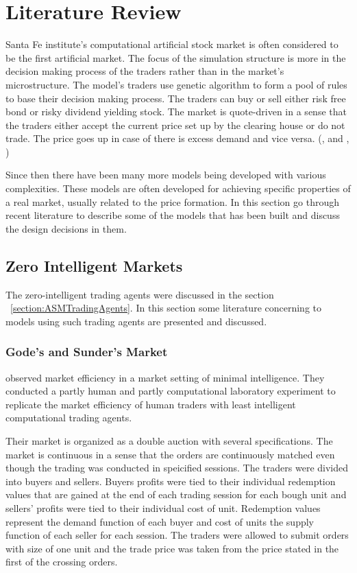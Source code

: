 \section{Literature Review}

Santa Fe institute's computational artificial stock 
market is often considered to be the first artificial market. 
The focus of the simulation structure is more in the 
decision making process of the traders rather than in the 
market's microstructure. The model's traders use 
genetic algorithm to form a pool of rules to base
their decision making process. The traders can buy or
sell either risk free bond or risky dividend yielding stock.
The market is quote-driven in a sense that the traders
either accept the current price set up by the clearing house
or do not trade. The price goes up in case of there is excess
demand and vice versa. (\citeauthor{SantaFe94}, \citeyear{SantaFe94} 
and \citeauthor{SantaFe99}, \citeyear{SantaFe99})

Since then there have been many more models being 
developed with various complexities. These models are often developed
for achieving specific properties of a real market, 
usually related to the price formation. In this section
go through recent literature to describe some of the models
that has been built and discuss the design decisions in them.



\subsection{Zero Intelligent Markets}


The zero-intelligent trading agents were discussed in the section 
~\ref{section:ASMTradingAgents}. In this section some literature
concerning to models using such trading agents are presented and
discussed.

\subsubsection{Gode's and Sunder's Market}
\citet{God93} observed market efficiency in a market setting
of minimal intelligence. They conducted a partly human and partly
computational laboratory experiment to replicate the market
efficiency of human traders with least intelligent computational
trading agents.

Their market is organized as a double auction with several
specifications. The market is continuous in a sense that the 
orders are continuously matched even though the trading was
conducted in speicified sessions. The traders were divided 
into buyers and sellers. Buyers profits were tied to their 
individual redemption values that are gained at the end of
each trading session for each bough unit and sellers' profits
were tied to their individual cost of unit. Redemption values
represent the demand function of each buyer and cost of units 
the supply function of each seller for each session. The
traders were allowed to submit orders with size of one unit
and the trade price was taken from the price stated in the 
first of the crossing orders.


